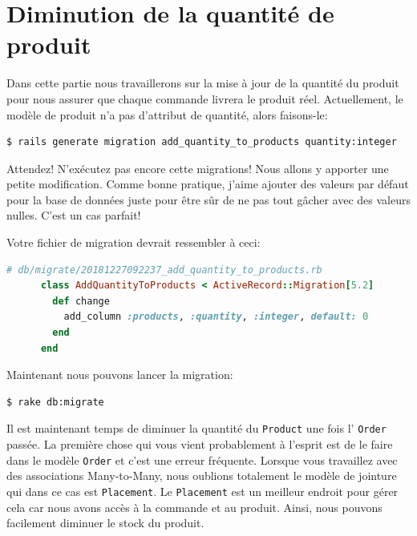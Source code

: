 \documentclass[]{report}
\begin{document}
  \section{Diminution de la quantité de produit}

    Dans cette partie nous travaillerons sur la mise à jour de la quantité du produit pour nous assurer que chaque commande livrera le produit réel. Actuellement, le modèle de produit n'a pas d'attribut de quantité, alors faisons-le:

    \begin{scriptsize}
      \begin{lstlisting}[language=bash]
      $ rails generate migration add_quantity_to_products quantity:integer
      \end{lstlisting}
    \end{scriptsize}

    Attendez! N'exécutez pas encore cette migrations! Nous allons y apporter une petite modification. Comme bonne pratique, j'aime ajouter des valeurs par défaut pour la base de données juste pour être sûr de ne pas tout gâcher avec des valeurs nulles. C'est un cas parfait!

    Votre fichier de migration devrait ressembler à ceci:

    \begin{scriptsize}
      \begin{lstlisting}[language=ruby]
      # db/migrate/20181227092237_add_quantity_to_products.rb
      class AddQuantityToProducts < ActiveRecord::Migration[5.2]
        def change
          add_column :products, :quantity, :integer, default: 0
        end
      end
      \end{lstlisting}
    \end{scriptsize}

    Maintenant nous pouvons lancer la migration:

    \begin{scriptsize}
      \begin{lstlisting}[language=bash]
      $ rake db:migrate
      \end{lstlisting}
    \end{scriptsize}

    Il est maintenant temps de diminuer la quantité du \verb|Product| une fois l' \verb|Order| passée. La première chose qui vous vient probablement à l'esprit est de le faire dans le modèle \verb|Order| et c'est une erreur fréquente. Lorsque vous travaillez avec des associations Many-to-Many, nous oublions totalement le modèle de jointure qui dans ce cas est \verb|Placement|. Le \verb|Placement| est un meilleur endroit pour gérer cela car nous avons accès à la commande et au produit. Ainsi, nous pouvons facilement diminuer le stock du produit.
\end{document}
